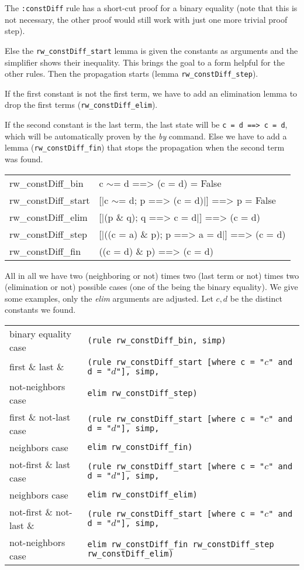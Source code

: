 \documentclass[10pt,a4paper]{article}
\newcommand{\ttt}{\texttt}
\newcommand{\negat}{\ensuremath{\sim}}
\newenvironment{pt}[1]{\begin{center}\begin{tt}\begin{tabular}{#1}\hline}{\end{tabular}\end{tt}\end{center}}
\newcommand{\pl}[1]{#1 \\[1mm]}
\newcommand{\pll}[1]{#1 \\\hline}
\newenvironment{rt}{\begin{center}\begin{tabular}{|l l|}\hline}{\end{tabular}\end{center}}
\newcommand{\rl}[2]{\rm{#1} & \tt{#2} \\[1mm]}
\newcommand{\rll}[2]{\rm{#1} & \tt{#2} \\\hline}
\def\ind{\quad}
\begin{document}
The \ttt{:constDiff} rule has a short-cut proof for a binary equality (note that this is not necessary, the other proof would still work with just one more trivial proof step).

Else the \ttt{rw\_constDiff\_start} lemma is given the constants as arguments and the simplifier shows their inequality. This brings the goal to a form helpful for the other rules. Then the propagation starts (lemma \ttt{rw\_constDiff\_step}).

If the first constant is not the first term, we have to add an elimination lemma to drop the first terms (\ttt{rw\_constDiff\_elim}).

If the second constant is the last term, the last state will be \ttt{c = d ==> c = d}, which will be automatically proven by the \emph{by} command. Else we have to add a lemma (\ttt{rw\_constDiff\_fin}) that stops the propagation when the second term was found.
%
\begin{pt}{ll}
	\pl{rw\_constDiff\_bin & c \negat= d ==> (c = d) = False}
	\pl{rw\_constDiff\_start & [|c \negat= d; p ==> (c = d)|] ==> p = False}
	\pl{rw\_constDiff\_elim & [|(p \& q); q ==> c = d|] ==> (c = d)}
	\pl{rw\_constDiff\_step & [|((c = a) \& p); p ==> a = d|] ==> (c = d)}
	\pll{rw\_constDiff\_fin & ((c = d) \& p) ==> (c = d)}
\end{pt}

All in all we have two (neighboring or not) times two (last term or not) times two (elimination or not) possible cases (one of the being the binary equality). We give some examples, only the \emph{elim} arguments are adjusted. Let $c, d$ be the distinct constants we found.
%
\begin{rt}
	\rl{binary equality case}{(rule rw\_constDiff\_bin, simp)}
	\rl{first \& last \&}{(rule rw\_constDiff\_start [where c = "$c$" and d = "$d$"], simp,}
		\rl{\ind not-neighbors case}{\ind elim rw\_constDiff\_step)}
	\rl{first \& not-last case}{(rule rw\_constDiff\_start [where c = "$c$" and d = "$d$"], simp,}
		\rl{\ind neighbors case}{\ind elim rw\_constDiff\_fin)}
	\rl{not-first \& last case}{(rule rw\_constDiff\_start [where c = "$c$" and d = "$d$"], simp,}
		\rl{\ind neighbors case}{\ind elim rw\_constDiff\_elim)}
	\rl{not-first \& not-last \&}{(rule rw\_constDiff\_start [where c = "$c$" and d = "$d$"], simp,}
		\rll{\ind not-neighbors case}{\ind elim rw\_constDiff\_fin rw\_constDiff\_step rw\_constDiff\_elim)}
\end{rt}
\end{document}
